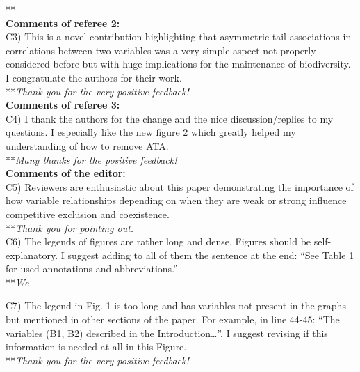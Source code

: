 \documentclass[letterpaper,11pt]{article}
\begin{document}
\noindent ***\emph{} \\


\noindent \textbf{Comments of referee 2:} \\

\noindent C3) This is a novel contribution highlighting that asymmetric tail associations in correlations between two variables was a very simple aspect not properly considered before but with huge implications for the maintenance of biodiversity. I congratulate the authors for their work. \\

\noindent ***\emph{Thank you for the very positive feedback!} \\

\noindent \textbf{Comments of referee 3:} \\

\noindent C4) I thank the authors for the change and the nice discussion/replies to my questions. I especially like the new figure 2 which greatly helped my understanding of how to remove ATA. \\
  
\noindent ***\emph{Many thanks for the positive feedback!} \\

\noindent \textbf{Comments of the editor:} \\

\noindent C5) Reviewers are enthusiastic about this paper demonstrating the importance of how variable relationships depending on when they are weak or strong influence competitive exclusion and coexistence. \\

\noindent ***\emph{Thank you for pointing out.} \\

\noindent C6) The legends of figures are rather long and dense. Figures should be self-explanatory. I suggest adding to all of them the sentence at the end: “See Table 1 for used annotations and abbreviations.” \\

\noindent ***\emph{We }

\noindent C7) The legend in Fig. 1 is too long and has variables not present in the graphs but mentioned in other sections of the paper. For example, in line 44-45: “The variables (B1, B2) described in the Introduction…”. I suggest revising if this information is needed at all in this Figure. \\

\noindent ***\emph{Thank you for the very positive feedback!} \\
\end{document}
